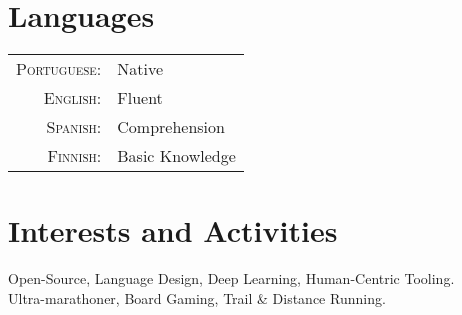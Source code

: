 \documentclass[a4paper,10pt]{article}
\begin{document}
\section{Languages}
\begin{tabular}{rl}
  \textsc{Portuguese:}&Native\\

  \textsc{English:}&Fluent\\

  \textsc{Spanish:}&Comprehension\\

  \textsc{Finnish:}&Basic Knowledge\\
\end{tabular}


\section{Interests and Activities}
Open-Source, Language Design, Deep Learning, Human-Centric Tooling. \\
Ultra-marathoner, Board Gaming, Trail \& Distance Running.
\end{document}
